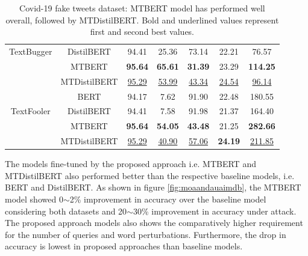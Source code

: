 \documentclass[%
	BCOR=8mm, %
	DIV=12,
	toc=bibliography, %
	toc=listof, %
	oneside, %
	egregdoesnotlikesansseriftitles, %
	]{scrbook}
\begin{document}
\begin{table}[H]
{\begin{tabular}{|c|c|c|c|c|c|c|}
TextBugger & DistilBERT &                94.41 &                    25.36 &                  73.14 &                     22.21 &            76.57 \\
                & MTBERT &               \textbf{95.64} &                    \textbf{65.61} &                  \textbf{31.39}&                     23.29 &           \textbf{114.25} \\
                & MTDistilBERT &                \underline{95.29} &                    \underline{53.99} &                  \underline{43.34} &                    \underline{24.54} &            \underline{96.14} \\
                \midrule
                 & BERT &                94.17 &                     7.62 &                  91.90 &                     22.48 &           180.55 \\
TextFooler & DistilBERT &                94.41 &                     7.58 &                  91.98 &                     21.37 &           164.40 \\
                & MTBERT &                \textbf{95.64} &                   \textbf{ 54.05} &                  \textbf{43.48} &                     21.25 &           \textbf{282.66} \\
                & MTDistilBERT &         \underline{95.29} &             \underline{40.90} &          \underline{57.06} &          \textbf{ 24.19} &     \underline{211.85} \\
                \bottomrule
        \end{tabular}
    }
    \caption[Experiment result of Covid-19 fake tweets]{Covid-19 fake tweets dataset: MTBERT model has performed well overall, followed by MTDistilBERT.  Bold and underlined values represent first and second best values.}
    \label{table:FakeNewsExpRes}
\end{table}
The models fine-tuned by the proposed approach i.e. MTBERT and MTDistilBERT also performed better than the respective baseline models, i.e. BERT and DistilBERT.  As shown in figure \ref{fig:moaandauaimdb}, the MTBERT model showed 0$\sim$2\% improvement in accuracy over the baseline model considering both datasets and 20$\sim$30\% improvement in accuracy under attack. \\
The proposed approach models also shows the comparatively higher requirement for the number of queries and word perturbations. Furthermore, the drop in accuracy is lowest in proposed approaches than baseline models.
\end{document}
